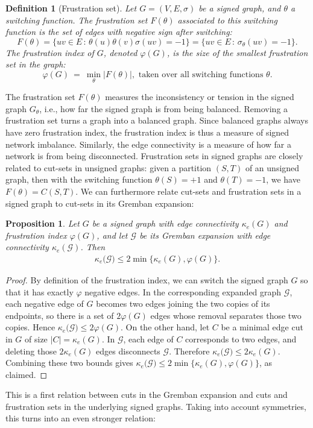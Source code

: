 \documentclass[reprint,onecolumn]{article}
\newtheorem{definition}[theorem]{Definition}  %
\newtheorem{proposition}[theorem]{Proposition}
\newcommand{\1}{\mathbb{1}}
\newcommand{\0}{\mathbf{0}}
\begin{document}
\begin{definition}[Frustration set]  \label{def:frustration_set}
    Let \(G=(V,E,\sigma)\) be a signed graph, and $\theta$ a switching function. 
    The \emph{frustration set} $F(\theta)$ associated to this switching function is the set of edges with negative sign after switching:
    $$
    F(\theta) = \{ uv\in E \,:\, \theta(u)\theta(v)\sigma(uv)=-1\} = \{uv\in E\,:\, \sigma_\theta(uv)=-1\}.
    $$
    The \emph{frustration index} of \(G\), denoted \(\varphi(G)\), is the size of the smallest frustration set in the graph:
    \[
        \varphi(G)
        \ =\ 
        \min_{\theta}
        \bigl|F(\theta)\bigr|, \text{~taken over all switching functions $\theta$.}
    \]
\end{definition}
The frustration set $F(\theta)$ measures the inconsistency or tension in the signed graph $G_\theta$, i.e., how far the signed graph is from being balanced. Removing a frustration set turns a graph into a balanced graph. Since balanced graphs always have zero frustration index, the frustration index is thus a measure of signed network imbalance. Similarly, the edge connectivity is a measure of how far a network is from being disconnected. Frustration sets in signed graphs are closely related to cut-sets in unsigned graphs: given a partition $(S,T)$ of an unsigned graph, then with the switching function $\theta(S)=+1$ and $\theta(T)=-1$, we have $F(\theta)=C(S,T)$. We can furthermore relate cut-sets and frustration sets in a signed graph to cut-sets in its Gremban expansion:

\begin{proposition}  \label{prop:frustration_cut}
Let \(G\) be a signed graph with edge connectivity $\kappa_e(G)$ and  frustration index \(\varphi(G)\), and let $\mathcal{G}$ be its Gremban expansion with edge connectivity $\kappa_e(\mathcal{G})$. 
Then 
\begin{align}  \label{eq:frustration_cut}
\kappa_e\bigl(\mathcal G\bigr)\le2\min\{\kappa_e(G),\varphi(G)\}.     
\end{align}
\end{proposition}
    
\begin{proof}
By definition of the frustration index, we can switch the signed graph \(G\) so that it has exactly \(\varphi\) negative edges.  In the corresponding expanded graph \(\mathcal G\), each negative edge of \(G\) becomes two edges joining the two copies of its endpoints, so there is a set of \(2\varphi(G)\) edges whose removal separates those two copies.  Hence \(\kappa_e\bigl(\mathcal G\bigr)\le2\varphi(G)\).
On the other hand, let \(C\) be a minimal edge cut in \(G\) of size \(\lvert C\rvert=\kappa_e(G)\).  In \(\mathcal G\), each edge of \(C\) corresponds to two edges, and deleting those \(2\kappa_e(G)\) edges disconnects \(\mathcal G\).  Therefore \(\kappa_e\bigl(\mathcal G\bigr)\le2\kappa_e(G)\). Combining these two bounds gives \(\kappa_e\bigl(\mathcal G\bigr)\le2\min\{\kappa_e(G),\varphi(G)\}\), as claimed.
\end{proof}
This is a first relation between cuts in the Gremban expansion and cuts and frustration sets in the underlying signed graphs. Taking into account symmetries, this turns into an even stronger relation:
\end{document}
